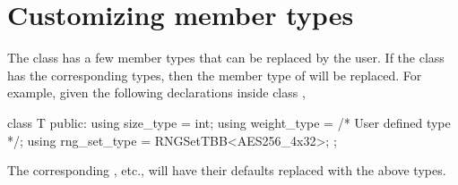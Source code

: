 \section{Customizing member types}
\label{sec:Customizing member types}

The  class has a few member types that can be replaced
by the user. If the class  has the corresponding types, then the
member type of  will be replaced. For example, given the
following declarations inside class ,
\begin{cppcode}
  class T
  {
      public:
      using size_type = int;
      using weight_type = /* User defined type */;
      using rng_set_type = RNGSetTBB<AES256_4x32>;
  };
\end{cppcode}
The corresponding , etc., will have their
defaults replaced with the above types.

